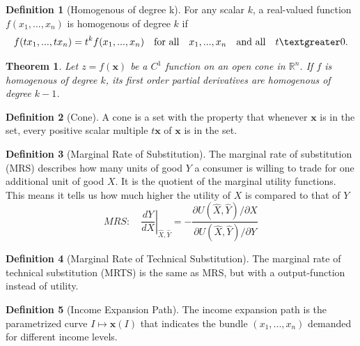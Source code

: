 \documentclass{article}
\newtheorem{theorem}{Theorem}
\theoremstyle{definition}
\newtheorem{definition}{Definition}
\theoremstyle{Solution}
\begin{document}
\begin{definition}[Homogenous of degree k] For any scalar $k$, a real-valued function $f(x_1,...,x_n)$ is homogenous of degree $k$ if
\begin{equation}
	 f(tx_1,...,tx_n)=t^kf(x_1,...,x_n) \quad \text{for all} \quad x_1,...,x_n \quad \text{and all} \quad t \textgreater 0.
\end{equation}
\end{definition}

\begin{theorem} 
Let $z=f(\textbf{x})$ be a $C^1$ function on an open cone in $\mathbb{R}^n$. If $f$ is homogenous of degree $k$, its first order partial derivatives are homogenous of degree $k-1$.
\end{theorem}

\begin{definition}[Cone]
A cone is a set with the property that whenever $\textbf{x}$ is in the set, every positive scalar multiple $t\textbf{x}$ of $\textbf{x}$ is in the set.
\end{definition}

\begin{definition}[Marginal Rate of Substitution]
The marginal rate of substitution (MRS) describes how many units of good $Y$ a consumer is willing to trade for one additional unit of good $X$. It is the quotient of the marginal utility functions. This means it tells us how much higher the utility of $X$ is compared to that of $Y$ 
\begin{equation}
	MRS: \quad \left.\frac{dY}{dX}\right|_{\hat X,\hat Y} = - \frac{\partial U(\hat X, \hat Y)/ \partial X}{\partial U(\hat X, \hat Y)/ \partial Y}
\end{equation}
\end{definition}

\begin{definition}[Marginal Rate of Technical Substitution]
The marginal rate of technical substitution (MRTS) is the same as MRS, but with a output-function instead of utility.
\end{definition}

\begin{definition}[Income Expansion Path]
The income expansion path is the parametrized curve $I \mapsto \textbf{x}(I)$ that indicates the bundle $(x_1,...,x_n)$ demanded for different income levels. 
\end{definition}
\end{document}
